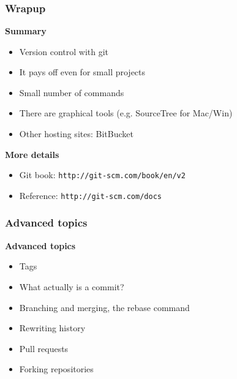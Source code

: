 \documentclass{beamer}
\begin{document}

\begin{frame}
  \frametitle{${}^{}$}
\end{frame}


\begin{frame}
  \frametitle{Wrapup}
  \textbf{\Large Summary}
  \begin{itemize}
    \item Version control with git
    \item It pays off even for small projects
    \item Small number of commands 
    \item There are graphical tools (e.g. SourceTree for Mac/Win)
    \item Other hosting sites: BitBucket
  \end{itemize}
  \textbf{\Large More details}
  \begin{itemize}
  \item Git book: \texttt{http://git-scm.com/book/en/v2}
  \item Reference: \texttt{http://git-scm.com/docs}
  \end{itemize}
\end{frame}


\begin{frame}
  \frametitle{Advanced topics}
  \textbf{\Large Advanced topics}
  \begin{itemize}
    \item Tags
    \item What actually is a commit?
    \item Branching and merging, the rebase command
    \item Rewriting history
    \item Pull requests
    \item Forking repositories
  \end{itemize}
\end{frame}

\end{document}
